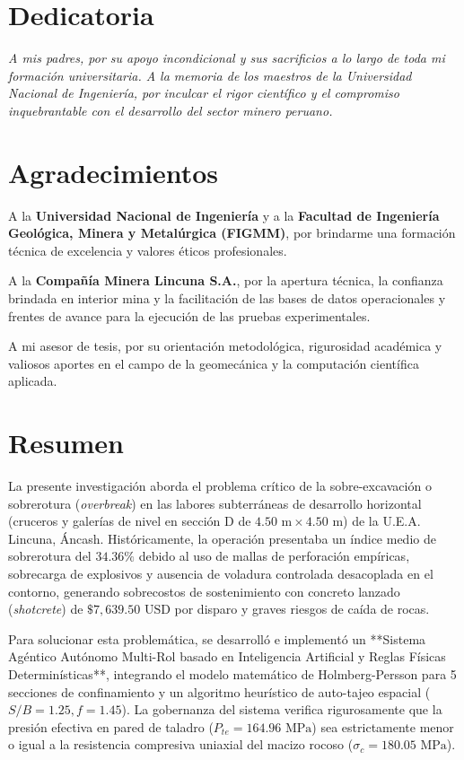 \documentclass[12pt,a4paper,oneside]{book}
\begin{document}
\chapter*{Dedicatoria}
\textit{A mis padres, por su apoyo incondicional y sus sacrificios a lo largo de toda mi formación universitaria. A la memoria de los maestros de la Universidad Nacional de Ingeniería, por inculcar el rigor científico y el compromiso inquebrantable con el desarrollo del sector minero peruano.}

\chapter*{Agradecimientos}
A la \textbf{Universidad Nacional de Ingeniería} y a la \textbf{Facultad de Ingeniería Geológica, Minera y Metalúrgica (FIGMM)}, por brindarme una formación técnica de excelencia y valores éticos profesionales.

A la \textbf{Compañía Minera Lincuna S.A.}, por la apertura técnica, la confianza brindada en interior mina y la facilitación de las bases de datos operacionales y frentes de avance para la ejecución de las pruebas experimentales.

A mi asesor de tesis, por su orientación metodológica, rigurosidad académica y valiosos aportes en el campo de la geomecánica y la computación científica aplicada.

\chapter*{Resumen}
La presente investigación aborda el problema crítico de la sobre-excavación o sobrerotura (\textit{overbreak}) en las labores subterráneas de desarrollo horizontal (cruceros y galerías de nivel en sección D de $4.50\text{ m} \times 4.50\text{ m}$) de la U.E.A. Lincuna, Áncash. Históricamente, la operación presentaba un índice medio de sobrerotura del $34.36\%$ debido al uso de mallas de perforación empíricas, sobrecarga de explosivos y ausencia de voladura controlada desacoplada en el contorno, generando sobrecostos de sostenimiento con concreto lanzado (\textit{shotcrete}) de $\$7,639.50\text{ USD}$ por disparo y graves riesgos de caída de rocas. 

Para solucionar esta problemática, se desarrolló e implementó un **Sistema Agéntico Autónomo Multi-Rol basado en Inteligencia Artificial y Reglas Físicas Determinísticas**, integrando el modelo matemático de Holmberg-Persson para 5 secciones de confinamiento y un algoritmo heurístico de auto-tajeo espacial ($S/B = 1.25, f = 1.45$). La gobernanza del sistema verifica rigurosamente que la presión efectiva en pared de taladro ($P_{te} = 164.96\text{ MPa}$) sea estrictamente menor o igual a la resistencia compresiva uniaxial del macizo rocoso ($\sigma_c = 180.05\text{ MPa}$).
\end{document}

